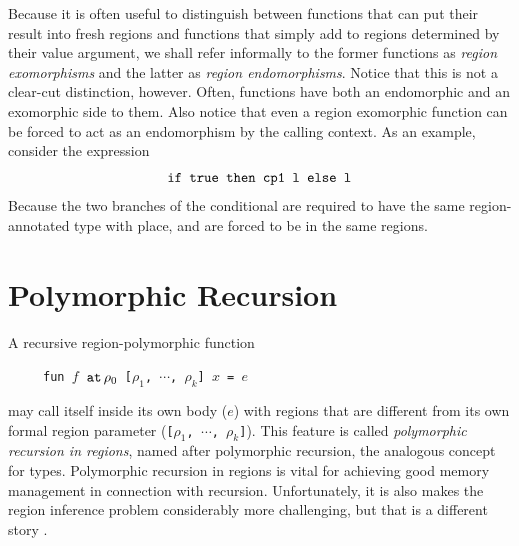 \documentclass[12pt]{book}
\begin{document}
Because it is often useful to distinguish between functions that can
put their result into fresh regions and functions that simply add to
regions determined by their value argument, we shall refer informally
to the former functions as 
%
{\em region exomorphisms} and the latter as
%
{\em region endomorphisms}. Notice that this is not a clear-cut
distinction, however. Often, functions have both an endomorphic and an
exomorphic side to them. Also notice that even a region exomorphic
function can be forced to act as an endomorphism by the calling
context. As an example, consider the expression
$$\hbox{\tt if true then cp1 l else l}$$
Because the two branches of the conditional are required to have the same region-annotated
type with place,  and  are forced to be in the same regions.
%
\section{Polymorphic Recursion}
%
\label{polyrec.sec}
A recursive region-polymorphic function
\begin{tabbing}
\ \ \ \ \ \=\tt fun $f$ $\mathbin{\hbox{\tt at}}\,\rho_0$ [$\rho_1$, $\cdots$, $\rho_k$] $x$ = $e$
\end{tabbing}
may call itself inside its own body ($e$) with regions that are different
from its own formal region parameter ({\tt [$\rho_1$, $\cdots$, $\rho_k$]}).
This feature is called {\it polymorphic recursion in regions}, named after
polymorphic recursion, the analogous concept for types.
Polymorphic recursion in regions is vital for achieving good 
memory management in connection with recursion.
Unfortunately, it is also makes  the region inference problem considerably more
challenging, but that is a different story \cite{tofbir98}.
\end{document}
